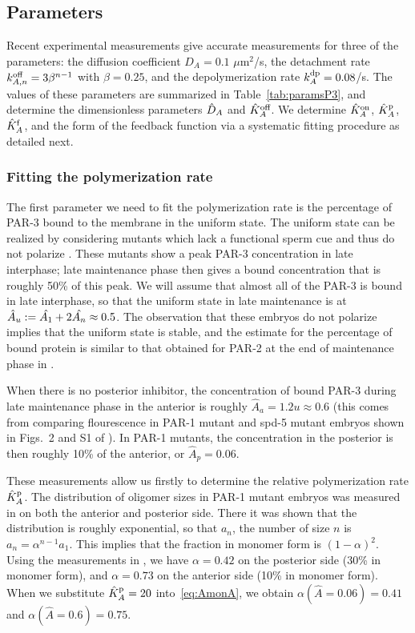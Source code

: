 \documentclass[11pt]{article}
\newcommand{\6}[1]{#1_{\text{6}}}
\newcommand{\3}[1]{#1_{\text{3}}}
\begin{document}
\subsection{Parameters \label{sec:paramsP3}}
Recent experimental measurements \cite{lang2023oligomerization} give accurate measurements for three of the parameters: the diffusion coefficient $D_A=0.1$ $\mu$m$^2$/s, the detachment rate $k^\text{off}_{A,n}=3\beta^{n-1}$ with $\beta=0.25$, and the depolymerization rate $k^\text{dp}_A=0.08$/s. The values of these parameters are summarized in Table\ \ref{tab:paramsP3}, and determine the dimensionless parameters $\hat{D}_A$ and $\hat{K}^\text{off}_A$. We determine $\hat{K}^\text{on}_A$, $\hat{K}^\text{p}_A$, $\hat{K}^\text{f}_A$, and the form of the feedback function via a systematic fitting procedure as detailed next.

\subsubsection{Fitting the polymerization rate}
The first parameter we need to fit the polymerization rate is the percentage of PAR-3 bound to the membrane in the uniform state. The uniform state can be realized by considering mutants which lack a functional sperm cue and thus do not polarize \cite[Fig.~S1]{lang2023oligomerization}. These mutants show a peak PAR-3 concentration in late interphase; late maintenance phase then gives a bound concentration that is roughly 50\% of this peak. We will assume that almost all of the PAR-3 is bound in late interphase, so that the uniform state in late maintenance is at $\hat A_u:=\hat{A_1}+2\hat{A_n} \approx 0.5$. The observation that these embryos do not polarize implies that the uniform state is stable, and the estimate for the percentage of bound protein is similar to that obtained for PAR-2 at the end of maintenance phase in \cite[Fig.~S3]{gross2019guiding}. 

When there is no posterior inhibitor, the concentration of bound PAR-3 during late maintenance phase in the anterior is roughly $\hat A_a=1.2u \approx 0.6$ (this comes from comparing flourescence in PAR-1 mutant and spd-5 mutant embryos shown in Figs.\ 2 and S1 of \cite{lang2023oligomerization}). In PAR-1 mutants, the concentration in the posterior is then roughly 10\% of the anterior, or $\hat A_p=0.06$. 

These measurements allow us firstly to determine the relative polymerization rate $\hat{K}^\text{p}_A$. The distribution of oligomer sizes in PAR-1 mutant embryos was measured in \cite{lang2023oligomerization} on both the anterior and posterior side. There it was shown that the distribution is roughly exponential, so that $a_n$, the number of size $n$ is $a_n=\alpha^{n-1} a_1$. This implies that the fraction in monomer form is $\left(1-\alpha\right)^2$. Using the measurements in \cite{lang2023oligomerization}, we have $\alpha=0.42$ on the posterior side (30\% in monomer form), and $\alpha=0.73$ on the anterior side (10\% in monomer form). When we substitute $\hat{K}^\text{p}_A=20$ into\ \eqref{eq:AmonA}, we obtain $\alpha(\hat A = 0.06)=0.41$ and $\alpha(\hat A = 0.6)=0.75$. 
\end{document}
